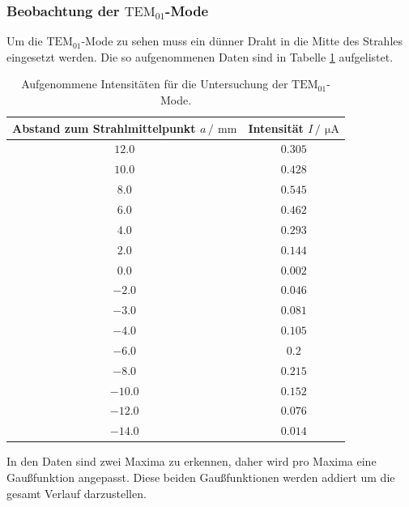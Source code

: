 \subsubsection{Beobachtung der \texorpdfstring{$\text{TEM}_{01}$}{T1}-Mode}
Um die $\text{TEM}_{01}$-Mode zu sehen muss ein dünner Draht in die Mitte des Strahles eingesetzt werden. Die 
so aufgenommenen Daten sind in Tabelle \ref{tab:TEM01} aufgelistet.
\begin{table}
  \centering
  \caption{Aufgenommene Intensitäten für die Untersuchung der $\text{TEM}_{01}$-Mode.}
  \label{tab:TEM01}
  \begin{tabular}{c c}
    \toprule
    Abstand zum Strahlmittelpunkt $a\,/\,\SI{}{\milli\meter}$&Intensität $I \,/\,\SI{}{\micro\ampere}$\\
    \midrule
    $\num{12.0}$&$\num{0.305}$\\
    $\num{10.0}$&$\num{0.428}$\\
    $\num{8.0}$&$\num{0.545}$\\
    $\num{6.0}$&$\num{0.462}$\\
    $\num{4.0}$&$\num{0.293}$\\
    $\num{2.0}$&$\num{0.144}$\\
    $\num{0.0}$&$\num{0.002}$\\
    $\num{-2.0}$&$\num{0.046}$\\
    $\num{-3.0}$&$\num{0.081}$\\
    $\num{-4.0}$&$\num{0.105}$\\
    $\num{-6.0}$&$\num{0.2}$\\
    $\num{-8.0}$&$\num{0.215}$\\
    $\num{-10.0}$&$\num{0.152}$\\
    $\num{-12.0}$&$\num{0.076}$\\
    $\num{-14.0}$&$\num{0.014}$\\
    \bottomrule
  \end{tabular}
\end{table}
\FloatBarrier
In den Daten sind zwei Maxima zu erkennen, daher wird pro Maxima eine Gaußfunktion angepasst. Diese beiden Gaußfunktionen werden
addiert um die gesamt Verlauf darzustellen.
\FloatBarrier
